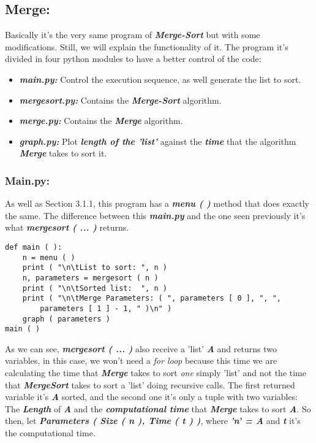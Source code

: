 \subsection{Merge:}

Basically it's the very same program of {\bfseries\itshape Merge-Sort} but with some modifications. Still, we will explain the functionality of it. The program it's divided in four python modules to have a better control of the code:

\begin{itemize}
\item {\bfseries\itshape main.py:} Control the execution sequence, as well generate the list to sort.
\item {\bfseries\itshape mergesort.py:} Contains the {\bfseries\itshape Merge-Sort} algorithm.
\item {\bfseries\itshape merge.py:} Contains the {\bfseries\itshape Merge} algorithm.
\item {\bfseries\itshape graph.py:} Plot {\bfseries\itshape length of the 'list'} against the {\bfseries\itshape time} that the algorithm {\bfseries\itshape Merge} takes to sort it. 
\end{itemize} 

\subsubsection{Main.py:}

As well as Section 3.1.1, this program has a {\bfseries\itshape menu ( )} method that does exactly the same. The difference between this {\bfseries\itshape main.py} and the one seen previously it's what {\bfseries\itshape mergesort ( ... )} returns. \hfill \break

\begin{lstlisting}
def main ( ):
    n = menu ( )
    print ( "\n\tList to sort: ", n )
    n, parameters = mergesort ( n )
    print ( "\n\tSorted list:  ", n )
    print ( "\n\tMerge Parameters: ( ", parameters [ 0 ], ", ", 
    	parameters [ 1 ] - 1, " )\n" )
    graph ( parameters )
main ( )
\end{lstlisting} \hfill

As we can see, {\bfseries\itshape mergesort ( ... )} also receive a 'list' {\bfseries\itshape A} and returns two variables, in this case, we won't need a {\itshape for loop} because this time we are calculating the time that {\bfseries\itshape Merge} takes to sort {\itshape one} simply 'list' and not the time that {\bfseries\itshape MergeSort} takes to sort a 'list' doing recursive calls. The first returned variable it's {\bfseries\itshape A} sorted, and the second one it's only a tuple with two variables: The {\bfseries\itshape Length} of {\bfseries\itshape A} and the {\bfseries\itshape computational time} that {\bfseries\itshape Merge} takes to sort {\bfseries\itshape A}. So then, let {\bfseries\itshape Parameters ( Size ( n ), Time ( t ) )}, where {\bfseries\itshape 'n' = A} and {\bfseries\itshape t} it's the computational time. 

